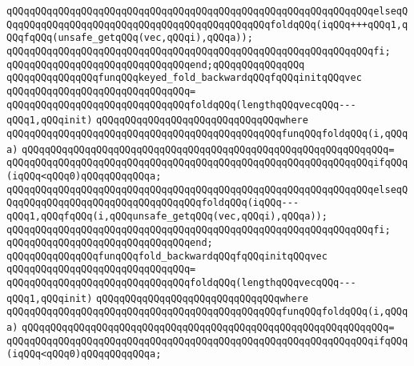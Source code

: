 \verb|qQQqqQQqqQQqqQQqqQQqqQQqqQQqqQQqqQQqqQQqqQQqqQQqqQQqqQQqqQQqqQQqelseqQQqqQQqqQQqqQQqqQQqqQQqqQQqqQQqqQQqqQQqqQQqqQQqfoldqQQq(iqQQq+++qQQq1,qQQqfqQQq(unsafe_getqQQq(vec,qQQqi),qQQqa));|\newline
\verb|qQQqqQQqqQQqqQQqqQQqqQQqqQQqqQQqqQQqqQQqqQQqqQQqqQQqqQQqqQQqqQQqfi;|\newline
\verb|qQQqqQQqqQQqqQQqqQQqqQQqqQQqqQQqend;qQQqqQQqqQQqqQQq|\newline
\newline
\verb|qQQqqQQqqQQqqQQqfunqQQqkeyed_fold_backwardqQQqfqQQqinitqQQqvec|\newline
\verb|qQQqqQQqqQQqqQQqqQQqqQQqqQQqqQQq=|\newline
\verb|qQQqqQQqqQQqqQQqqQQqqQQqqQQqqQQqfoldqQQq(lengthqQQqvecqQQq---qQQq1,qQQqinit)|\newline
\verb|qQQqqQQqqQQqqQQqqQQqqQQqqQQqqQQqwhere|\newline
\verb|qQQqqQQqqQQqqQQqqQQqqQQqqQQqqQQqqQQqqQQqqQQqqQQqfunqQQqfoldqQQq(i,qQQqa)|\newline
\verb|qQQqqQQqqQQqqQQqqQQqqQQqqQQqqQQqqQQqqQQqqQQqqQQqqQQqqQQqqQQqqQQq=|\newline
\verb|qQQqqQQqqQQqqQQqqQQqqQQqqQQqqQQqqQQqqQQqqQQqqQQqqQQqqQQqqQQqqQQqifqQQq(iqQQq<qQQq0)qQQqqQQqqQQqa;|\newline
\verb|qQQqqQQqqQQqqQQqqQQqqQQqqQQqqQQqqQQqqQQqqQQqqQQqqQQqqQQqqQQqqQQqelseqQQqqQQqqQQqqQQqqQQqqQQqqQQqqQQqqQQqfoldqQQq(iqQQq---qQQq1,qQQqfqQQq(i,qQQqunsafe_getqQQq(vec,qQQqi),qQQqa));|\newline
\verb|qQQqqQQqqQQqqQQqqQQqqQQqqQQqqQQqqQQqqQQqqQQqqQQqqQQqqQQqqQQqqQQqfi;|\newline
\verb|qQQqqQQqqQQqqQQqqQQqqQQqqQQqqQQqend;|\newline
\newline
\verb|qQQqqQQqqQQqqQQqfunqQQqfold_backwardqQQqfqQQqinitqQQqvec|\newline
\verb|qQQqqQQqqQQqqQQqqQQqqQQqqQQqqQQq=|\newline
\verb|qQQqqQQqqQQqqQQqqQQqqQQqqQQqqQQqfoldqQQq(lengthqQQqvecqQQq---qQQq1,qQQqinit)|\newline
\verb|qQQqqQQqqQQqqQQqqQQqqQQqqQQqqQQqwhere|\newline
\verb|qQQqqQQqqQQqqQQqqQQqqQQqqQQqqQQqqQQqqQQqqQQqqQQqfunqQQqfoldqQQq(i,qQQqa)|\newline
\verb|qQQqqQQqqQQqqQQqqQQqqQQqqQQqqQQqqQQqqQQqqQQqqQQqqQQqqQQqqQQqqQQq=|\newline
\verb|qQQqqQQqqQQqqQQqqQQqqQQqqQQqqQQqqQQqqQQqqQQqqQQqqQQqqQQqqQQqqQQqifqQQq(iqQQq<qQQq0)qQQqqQQqqQQqa;|\newline
